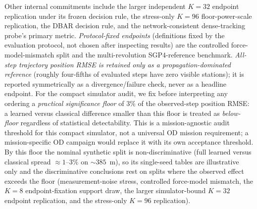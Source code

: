 \documentclass{article}
\begin{document}
Other internal commitments include the larger independent $K=32$ endpoint replication under its frozen decision rule, the stress-only $K=96$ floor-power-scale replication, the DBAR decision rule, and the network-consistent dense-tracking probe's primary metric. \emph{Protocol-fixed endpoints} (definitions fixed by the evaluation protocol, not chosen after inspecting results) are the controlled force-model-mismatch split and the multi-revolution SGP4-reference benchmark. \emph{All-step trajectory position RMSE is retained only as a propagation-dominated reference} (roughly four-fifths of evaluated steps have zero visible stations); it is reported symmetrically as a divergence/failure check, never as a headline endpoint. For the compact simulator audit, we fix before interpreting any ordering a \emph{practical significance floor} of \(3\%\) of the observed-step position RMSE: a learned versus classical difference smaller than this floor is treated as \emph{below-floor} regardless of statistical detectability. This is a mission-agnostic audit threshold for this compact simulator, not a universal OD mission requirement; a mission-specific OD campaign would replace it with its own acceptance threshold. By this floor the nominal synthetic split is non-discriminative (full learned versus classical spread $\approx 1$--$3\%$ on $\sim 385$~m), so its single-seed tables are illustrative only and the discriminative conclusions rest on splits where the observed effect exceeds the floor (measurement-noise stress, controlled force-model mismatch, the $K=8$ endpoint-fixation support draw, the larger simulator-bound $K=32$ endpoint replication, and the stress-only $K=96$ replication).
\end{document}
